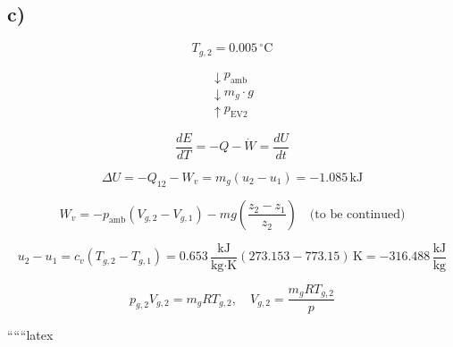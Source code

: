 

\subsection*{c)}

\[
T_{g,2} = 0.005 \, ^\circ \text{C}
\]

\[
\begin{array}{c}
\downarrow p_{\text{amb}} \\
\downarrow m_g \cdot g \\
\uparrow p_{\text{EV2}}
\end{array}
\]

\[
\frac{dE}{dT} = -Q - \dot{W} = \frac{dU}{dt}
\]

\[
\Delta U = -Q_{12} - W_{v} = m_g (u_2 - u_1) = -1.085 \, \text{kJ}
\]

\[
W_v = -p_{\text{amb}} (V_{g,2} - V_{g,1}) - mg \left( \frac{z_2 - z_1}{z_2} \right) \quad \text{(to be continued)}
\]

\[
u_2 - u_1 = c_v (T_{g,2} - T_{g,1}) = 0.653 \, \frac{\text{kJ}}{\text{kg} \cdot \text{K}} (273.153 - 773.15) \, \text{K} = -316.488 \, \frac{\text{kJ}}{\text{kg}}
\]

\[
p_{g,2} V_{g,2} = m_g R T_{g,2}, \quad V_{g,2} = \frac{m_g R T_{g,2}}{p}
\]

``````latex